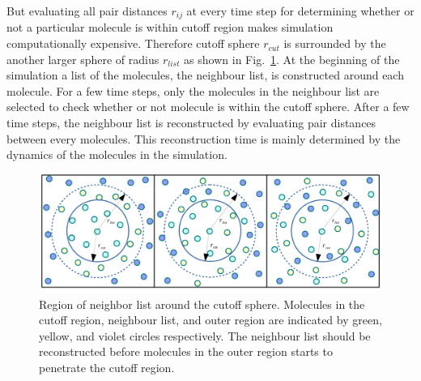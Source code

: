 But evaluating all pair distances $r_{ij}$ at every time step for determining whether or not a particular molecule is within cutoff region makes simulation computationally expensive. Therefore cutoff sphere $r_{cut}$ is surrounded by the another larger sphere of radius $r_{list}$ as shown in Fig.~\ref{fig:neighbourList}. At the beginning of the simulation a list of the molecules, the neighbour list, is constructed around each molecule. For a few time steps, only the molecules in the neighbour list are selected to check whether or not molecule is within the cutoff sphere. After a few time steps, the neighbour list is reconstructed by evaluating pair distances between every molecules. This reconstruction time is mainly determined by the dynamics of the molecules in the simulation.  
\begin{figure}[tpb]
  \begin{center}
    \centerline{\includegraphics[width = \linewidth]{neighbourList.pdf}}
    \caption{Region of neighbor list around the cutoff sphere. Molecules in the cutoff region, neighbour list, and outer region are indicated by green, yellow, and violet circles respectively. The neighbour list  should be reconstructed before molecules in the outer region starts to penetrate the cutoff region.}
    \label{fig:neighbourList}
  \end{center}
\end{figure}



